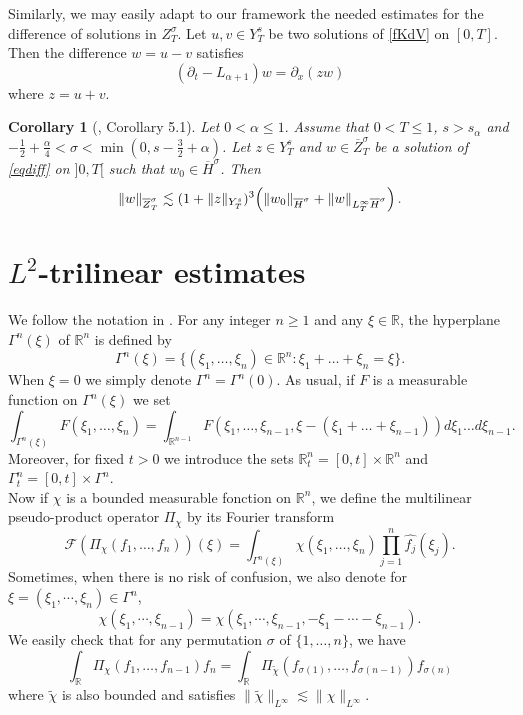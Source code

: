 \documentclass{amsart}
\newtheorem{corollary}[theorem]{Corollary}
\theoremstyle{definition}
\theoremstyle{remark}
\def\R{{\mathbb R}}
\numberwithin{equation}{section}
\begin{document}
Similarly, we may easily adapt to our framework the needed estimates for the difference of solutions in $Z^\sigma_T$. Let $u,v\in Y^s_T$ be two solutions of \eqref{fKdV} on $[0,T]$. Then the difference $w=u-v$ satisfies
\begin{equation}\label{eqdiff}
  (\partial_t-L_{\alpha+1})w = \partial_x(zw)
\end{equation} 
where $z=u+v$.
\begin{corollary}[\cite{MPV}, Corollary 5.1]\label{prop:zst}
Let $0<\alpha \le 1.$ Assume that $0<T\le 1$, $s>s_\alpha$ and  $ -\frac 1 2 +\frac \alpha 4< \sigma<\min (0,s-\frac 32+ \alpha) $. Let $z\in Y^s_T$ and $w\in \overline{Z}^\sigma_T$ be a solution of \eqref{eqdiff} on $]0,T[$ such that $ w_0\in \overline{H}^\sigma $. Then 
  \begin{equation}\label{est:zst}
    \|w\|_{\overline{Z}^{\sigma}_T} \lesssim (1+\|z\|_{Y^s_T} )^3\Bigl( \|w_0\|_{ \overline{H}^\sigma}+ \|w\|_{L^\infty_T \overline{H}^\sigma}\Bigr) \, .
  \end{equation}
\end{corollary}

\section{$L^2$-trilinear estimates} \label{Sec:3}
We follow the notation in \cite{TaoAJM01}. For any integer $n\ge 1$ and any $\xi\in\R$, the hyperplane $\Gamma^n(\xi)$ of $\mathbb R^n$ is defined by 
$$
\Gamma^n(\xi) = \{(\xi_1,\ldots, \xi_{n})\in \R^{n} : \xi_1+\ldots + \xi_{n}=\xi\}.
$$
When $\xi=0$ we simply denote $\Gamma^n = \Gamma^n(0)$. As usual, if $F$ is a measurable function on $\Gamma^n(\xi)$ we set
$$
\int_{\Gamma^n(\xi)} F(\xi_1,\ldots, \xi_{n}) = \int_{\R^{n-1}} F(\xi_1,\ldots,\xi_{n-1},  \xi - (\xi_1+\ldots+\xi_{n-1})) d\xi_1\ldots d\xi_{n-1}.
$$
Moreover, for fixed $t>0$ we introduce the sets $\R^n_t = [0,t]\times \R^n$ and $\Gamma^n_t = [0,t]\times\Gamma^n$.\\
Now if $\chi$ is a bounded measurable fonction on $\R^n$, we define the multilinear pseudo-product operator $\Pi_\chi$ by its Fourier transform
$$
\mathcal{F}\left(\Pi_\chi(f_1,\ldots, f_n)\right)(\xi) = \int_{\Gamma^{n}(\xi)} \chi(\xi_1,\ldots, \xi_n) \prod_{j=1}^n \widehat{f_j}(\xi_j) .
$$
Sometimes, when there is no risk of confusion, we also denote for $\xi=(\xi_1,\cdots,\xi_n) \in \Gamma^{n}$, 
\[ \chi(\xi_1,\cdots,\xi_{n-1})=\chi(\xi_1,\cdots,\xi_{n-1},-\xi_1-\cdots-\xi_{n-1}) . \]
We easily check that for any permutation $\sigma$ of $\{1,\ldots, n\}$, we have
\begin{equation}\label{Pi-sym}
  \int_\R \Pi_\chi(f_1,\ldots ,f_{n-1}) f_{n} = \int_\R \Pi_{\widetilde{\chi}}(f_{\sigma(1)},\ldots, f_{\sigma(n-1)}) f_{\sigma(n)}
\end{equation}
where $\widetilde{\chi}$ is also bounded and satisfies $\|\widetilde{\chi}\|_{L^\infty} \lesssim \|\chi\|_{L^\infty}$.
\end{document}
